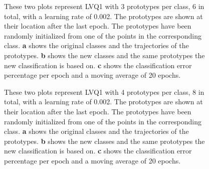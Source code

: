 \documentclass[twoside, a4paper, fleqn, reqno]{article}
\begin{document}
\begin{figure}[H]
	\centering
	\hfill
	\hfill
	\caption{
		These two plots represent LVQ1 with 3 prototypes per class, 6 in total, with a learning rate of 0.002.
		The prototypes are shown at their location after the last epoch. The prototypes have been
		randomly initialized from one of the points in the corresponding class.
		\textbf{a} shows the original classes and the trajectories of the prototypes.
		\textbf{b} shows the new classes and the same prototypes the new classification is based on.
		\textbf{c} shows the classification error percentage per epoch and a moving average of 20 epochs.
	}
\end{figure}

\begin{figure}[H]
	\centering
	\hfill
	\hfill
	\caption{
		These two plots represent LVQ1 with 4 prototypes per class, 8 in total, with a learning rate of 0.002.
		The prototypes are shown at their location after the last epoch. The prototypes have been
		randomly initialized from one of the points in the corresponding class.
		\textbf{a} shows the original classes and the trajectories of the prototypes.
		\textbf{b} shows the new classes and the same prototypes the new classification is based on.
		\textbf{c} shows the classification error percentage per epoch and a moving average of 20 epochs.
	}
\end{figure}
\end{document}
